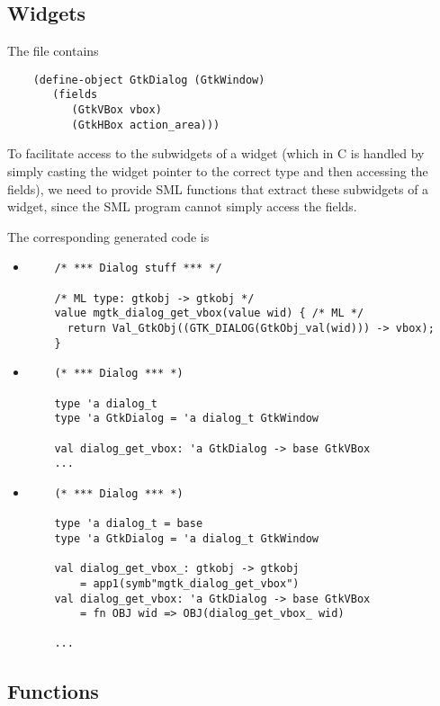 \documentclass{article}
\begin{document}
\subsection{Widgets}

The  file contains
\begin{verbatim}
    (define-object GtkDialog (GtkWindow)
       (fields
          (GtkVBox vbox)
          (GtkHBox action_area)))
\end{verbatim}

To facilitate access to the subwidgets of a widget (which in C is
handled by simply casting the widget pointer to the correct type and
then accessing the fields), we need to provide SML functions that
extract these subwidgets of a widget, since the SML program cannot
simply access the fields.

The corresponding generated code is
\begin{itemize}
\item {}
\begin{verbatim}
    /* *** Dialog stuff *** */

    /* ML type: gtkobj -> gtkobj */
    value mgtk_dialog_get_vbox(value wid) { /* ML */
      return Val_GtkObj((GTK_DIALOG(GtkObj_val(wid))) -> vbox);
    }
\end{verbatim}

\item {}
\begin{verbatim}
    (* *** Dialog *** *)

    type 'a dialog_t
    type 'a GtkDialog = 'a dialog_t GtkWindow

    val dialog_get_vbox: 'a GtkDialog -> base GtkVBox
    ...
\end{verbatim}

\item {}
\begin{verbatim}
    (* *** Dialog *** *)

    type 'a dialog_t = base
    type 'a GtkDialog = 'a dialog_t GtkWindow

    val dialog_get_vbox_: gtkobj -> gtkobj
        = app1(symb"mgtk_dialog_get_vbox")
    val dialog_get_vbox: 'a GtkDialog -> base GtkVBox
        = fn OBJ wid => OBJ(dialog_get_vbox_ wid)

    ...
\end{verbatim}

\end{itemize}


\subsection{Functions}
\end{document}
